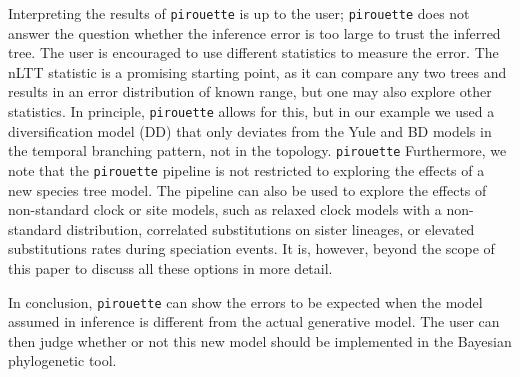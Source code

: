 Interpreting the results of \verb;pirouette; is up to the user; 
\verb;pirouette; does not answer the question 
whether the inference error is too large to trust the inferred tree. The user is encouraged to use different statistics to measure the error. The nLTT statistic is
a promising starting point, as it can compare any two trees and 
results in an error distribution of known range, but one may also explore other statistics.
In principle, \verb;pirouette; allows for this, but in our example we used a diversification model (DD) that only deviates from the Yule and BD models in the temporal branching pattern, not in the topology.
    \verb;pirouette;
Furthermore, we note that the \verb;pirouette; pipeline is not restricted 
to exploring the effects of a new species tree model. 
The pipeline can also be used to explore the effects of non-standard 
clock or site models, such as relaxed clock models with a non-standard 
distribution, correlated substitutions on sister lineages, or elevated 
substitutions rates during speciation events. 
It is, however, beyond the scope of this paper to discuss all these options 
in more detail.

In conclusion, \verb;pirouette; can show the errors to be expected
when the model assumed in inference is different from the actual generative model.
The user can then judge whether or not this new model 
should be implemented in the Bayesian phylogenetic tool. 




